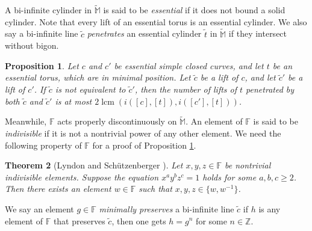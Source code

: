 \documentclass[12pt,a4paper]{amsart}
\numberwithin{equation}{section}
\newcommand{\FF}{\mathbb{F}}
\newcommand{\MM}{\mathbb{M}}
\theoremstyle{plain}
\newtheorem{theorem}{Theorem}[section]
\newtheorem{proposition}[theorem]{Proposition}
\theoremstyle{definition}
\theoremstyle{remark}
\begin{document}
A bi-infinite cylinder in $\widetilde{\MM}$ is said to be \emph{essential} if it does not bound a solid cylinder.
Note that every lift of an essential torus is an essential cylinder.
We also say a bi-infinite line $\tilde{c}$ \emph{penetrates} an essential cylinder $\tilde{t}$ in $\widetilde{\MM}$ if they intersect without bigon.

\begin{proposition} \label{prop:parallel_torus}
    Let $c$ and $c'$ be essential simple closed curves, and let $t$ be an essential torus, which are in minimal position.
    Let $\tilde{c}$ be a lift of $c$, and let $\tilde{c}'$ be a lift of $c'$.
    If $\tilde{c}$ is not equivalent to $\tilde{c}'$, then the number of lifts of $t$ penetrated by both $\tilde{c}$ and $\tilde{c}'$ is at most $2 \operatorname{lcm}(i([c],[t]), i([c'],[t]))$.
\end{proposition}

Meanwhile, $\FF$ acts properly discontinuously on $\widetilde{\MM}$.
An element of $\FF$ is said to be \emph{indivisible} if it is not a nontrivial power of any other element.
We need the following property of $\FF$ for a proof of Proposition \ref{prop:parallel_torus}.

\begin{theorem}[Lyndon and Sch{\"u}tzenberger \cite{MR162838}] \label{thm:equation}
    Let $x, y, z \in \FF$ be nontrivial indivisible elements.
    Suppose the equation $x^a y^b z^c = 1$ holds for some $a, b, c \geq 2$.
    Then there exists an element $w \in \FF$ such that $x, y, z \in \{ w, w^{-1}\}$.
\end{theorem}

We say an element $g \in \FF$ \emph{minimally preserves} a bi-infinite line $\tilde{c}$ if $h$ is any element of $\FF$ that preserves $\tilde{c}$, then one gets $h = g^n$ for some $n \in \mathbb{Z}$.
\end{document}
